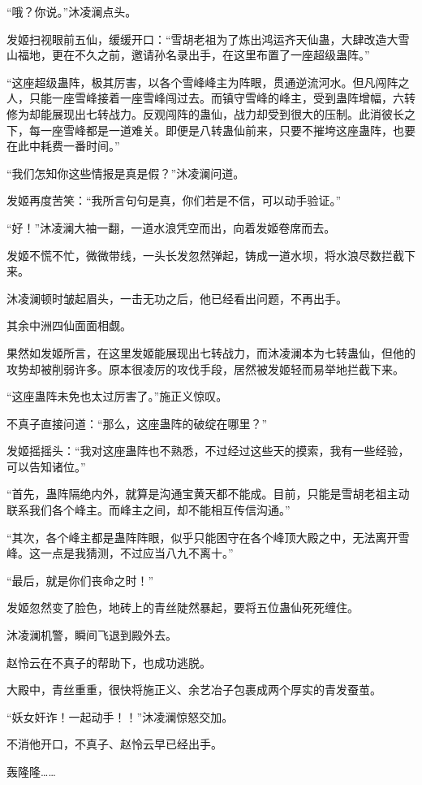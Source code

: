 \begin{this_body}
“哦？你说。”沐凌澜点头。

发姬扫视眼前五仙，缓缓开口：“雪胡老祖为了炼出鸿运齐天仙蛊，大肆改造大雪山福地，更在不久之前，邀请孙名录出手，在这里布置了一座超级蛊阵。”

“这座超级蛊阵，极其厉害，以各个雪峰峰主为阵眼，贯通逆流河水。但凡闯阵之人，只能一座雪峰接着一座雪峰闯过去。而镇守雪峰的峰主，受到蛊阵增幅，六转修为却能展现出七转战力。反观闯阵的蛊仙，战力却受到很大的压制。此消彼长之下，每一座雪峰都是一道难关。即便是八转蛊仙前来，只要不摧垮这座蛊阵，也要在此中耗费一番时间。”

“我们怎知你这些情报是真是假？”沐凌澜问道。

发姬再度苦笑：“我所言句句是真，你们若是不信，可以动手验证。”

“好！”沐凌澜大袖一翻，一道水浪凭空而出，向着发姬卷席而去。

发姬不慌不忙，微微带线，一头长发忽然弹起，铸成一道水坝，将水浪尽数拦截下来。

沐凌澜顿时皱起眉头，一击无功之后，他已经看出问题，不再出手。

其余中洲四仙面面相觑。

果然如发姬所言，在这里发姬能展现出七转战力，而沐凌澜本为七转蛊仙，但他的攻势却被削弱许多。原本很凌厉的攻伐手段，居然被发姬轻而易举地拦截下来。

“这座蛊阵未免也太过厉害了。”施正义惊叹。

不真子直接问道：“那么，这座蛊阵的破绽在哪里？”

发姬摇摇头：“我对这座蛊阵也不熟悉，不过经过这些天的摸索，我有一些经验，可以告知诸位。”

“首先，蛊阵隔绝内外，就算是沟通宝黄天都不能成。目前，只能是雪胡老祖主动联系我们各个峰主。而峰主之间，却不能相互传信沟通。”

“其次，各个峰主都是蛊阵阵眼，似乎只能困守在各个峰顶大殿之中，无法离开雪峰。这一点是我猜测，不过应当八九不离十。”

“最后，就是你们丧命之时！”

发姬忽然变了脸色，地砖上的青丝陡然暴起，要将五位蛊仙死死缠住。

沐凌澜机警，瞬间飞退到殿外去。

赵怜云在不真子的帮助下，也成功逃脱。

大殿中，青丝重重，很快将施正义、余艺冶子包裹成两个厚实的青发蚕茧。

“妖女奸诈！一起动手！！”沐凌澜惊怒交加。

不消他开口，不真子、赵怜云早已经出手。

轰隆隆……


\end{this_body}
